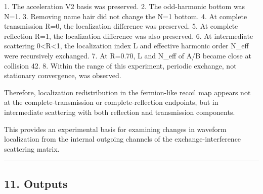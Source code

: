 \documentclass[
]{article}
\newenvironment{Shaded}{}{}
\newcommand{\NormalTok}[1]{#1}
\begin{document}
\begin{Shaded}
\begin{Highlighting}[]
\NormalTok{1. The acceleration V2 basis was preserved.}
\NormalTok{2. The odd{-}harmonic bottom was N=1.}
\NormalTok{3. Removing name hair did not change the N=1 bottom.}
\NormalTok{4. At complete transmission R=0, the localization difference was preserved.}
\NormalTok{5. At complete reflection R=1, the localization difference was also preserved.}
\NormalTok{6. At intermediate scattering 0\textless{}R\textless{}1, the localization index L and effective harmonic order N\_eff were recursively exchanged.}
\NormalTok{7. At R=0.70, L and N\_eff of A/B became close at collision 42.}
\NormalTok{8. Within the range of this experiment, periodic exchange, not stationary convergence, was observed.}
\end{Highlighting}
\end{Shaded}

Therefore, localization redistribution in the fermion-like recoil map
appears not at the complete-transmission or complete-reflection
endpoints, but in intermediate scattering with both reflection and
transmission components.

This provides an experimental basis for examining changes in waveform
localization from the internal outgoing channels of the
exchange-interference scattering matrix.

\begin{center}\rule{0.5\linewidth}{0.5pt}\end{center}

\subsection{11. Outputs}\label{outputs}
\end{document}
